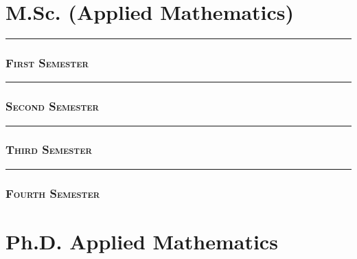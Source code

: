 \documentclass{article}
\newcommand{\cols}{1}
\begin{document}
\newpage
\part{\normalsize M.Sc. (Applied Mathematics)}
\newpage
\rule{100mm}{3pt}
\section{\scshape First Semester}

\newpage
\rule{100mm}{3pt}
\section{\scshape  Second Semester}
\newpage
\rule{100mm}{3pt}
\section{\scshape  Third Semester}
\newpage
\rule{100mm}{3pt}
\section{\scshape  Fourth Semester}


\newpage
\part{\normalsize Ph.D. Applied Mathematics}
%
\end{document}
